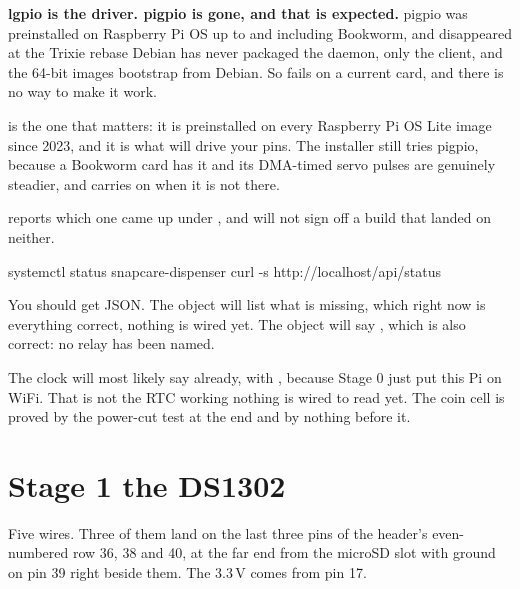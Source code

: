 \documentclass[11pt,a4paper]{article}
\begin{document}
\vspace{2mm}
\begin{notebox}
\textbf{\sffamily lgpio is the driver. pigpio is gone, and that is expected.}
pigpio was preinstalled on Raspberry Pi OS up to and including Bookworm, and
disappeared at the Trixie rebase \textemdash{} Debian has never packaged the
daemon, only the client, and the 64-bit images bootstrap from Debian. So
 fails on a current card, and there is no way to
make it work.

\vspace{1ex}
 is the one that matters: it is preinstalled on every
Raspberry Pi OS Lite image since 2023, and it is what will drive your pins. The
installer still tries pigpio, because a Bookworm card has it and its DMA-timed
servo pulses are genuinely steadier, and carries on when it is not there.

\vspace{1ex}
 reports which one came up under , and
 will not sign off a build that landed on neither.
\end{notebox}

\begin{provebox}
\provetitle
\begin{shell}
systemctl status snapcare-dispenser
curl -s http://localhost/api/status
\end{shell}
You should get JSON. The  object will list what is missing, which
right now is everything \textemdash{} correct, nothing is wired yet. The
 object will say , which is also correct: no relay
has been named.

\vspace{1ex}
The clock will most likely say  already, with ,
because Stage 0 just put this Pi on WiFi. That is not the RTC working \textemdash{}
nothing is wired to read yet. The coin cell is proved by the power-cut test at
the end and by nothing before it.
\end{provebox}

\section{Stage 1 \textemdash{} the DS1302}

Five wires. Three of them land on the last three pins of the header's
even-numbered row \textemdash{} 36, 38 and 40, at the far end from the microSD
slot \textemdash{} with ground on pin 39 right beside them. The 3.3\,V comes
from pin 17.
\end{document}
